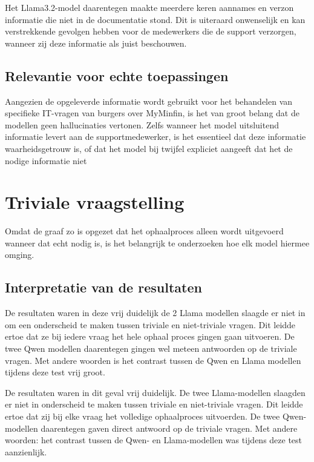 Het Llama3.2-model daarentegen maakte meerdere keren aannames en verzon informatie die niet in de documentatie stond. Dit is uiteraard onwenselijk en kan verstrekkende gevolgen hebben voor de medewerkers die de support verzorgen, wanneer zij deze informatie als juist beschouwen.

\subsection{Relevantie voor echte toepassingen}

Aangezien de opgeleverde informatie wordt gebruikt voor het behandelen van specifieke IT-vragen van burgers over MyMinfin, is het van groot belang dat de modellen geen hallucinaties vertonen. Zelfs wanneer het model uitsluitend informatie levert aan de supportmedewerker, is het essentieel dat deze informatie waarheidsgetrouw is, of dat het model bij twijfel expliciet aangeeft dat het de nodige informatie niet


\section{Triviale vraagstelling}

Omdat de graaf zo is opgezet dat het ophaalproces alleen wordt uitgevoerd wanneer dat echt nodig is, is het belangrijk te onderzoeken hoe elk model hiermee omging.

\subsection{Interpretatie van de resultaten}
De resultaten waren in deze vrij duidelijk de 2 Llama modellen slaagde er niet in om een onderscheid te maken tussen triviale en niet-triviale vragen. Dit leidde ertoe dat ze bij iedere vraag het hele ophaal proces gingen gaan uitvoeren. De twee Qwen modellen daarentegen gingen wel meteen antwoorden op de triviale vragen. Met andere woorden is het contrast tussen de Qwen en Llama modellen tijdens deze test vrij groot.

De resultaten waren in dit geval vrij duidelijk. De twee Llama-modellen slaagden er niet in onderscheid te maken tussen triviale en niet-triviale vragen. Dit leidde ertoe dat zij bij elke vraag het volledige ophaalproces uitvoerden. De twee Qwen-modellen daarentegen gaven direct antwoord op de triviale vragen. Met andere woorden: het contrast tussen de Qwen- en Llama-modellen was tijdens deze test aanzienlijk.

